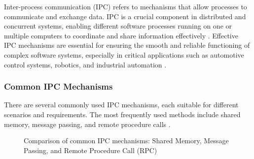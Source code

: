Inter-process communication (IPC) refers to mechanisms that allow processes to communicate and exchange data. IPC is a crucial component in distributed and concurrent systems, enabling different software processes running on one or multiple computers to coordinate and share information effectively \cite{stallings2018}. Effective IPC mechanisms are essential for ensuring the smooth and reliable functioning of complex software systems, especially in critical applications such as automotive control systems, robotics, and industrial automation \cite{tanenbaum2015}.

\subsubsection{Common IPC Mechanisms}

There are several commonly used IPC mechanisms, each suitable for different scenarios and requirements. The most frequently used methods include shared memory, message passing, and remote procedure calls \cite{stallings2018,tanenbaum2015}.

\vspace{1em}
\begin{figure}[H]
	\centering
	\caption{Comparison of common IPC mechanisms: Shared Memory, Message Passing, and Remote Procedure Call (RPC)}
	\label{fig:ipc_methods}
\end{figure}


